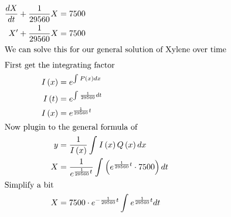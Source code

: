 \documentclass[12pt]{article}
\begin{document}
\begin{align}
  \frac{dX}{dt}+\frac{1}{29560}X                                                           & =7500                                                                                                                                                                     \\
  X'+\frac{1}{29560}X                                                                      & =7500                                                                                                                                                                     \\
  \intertext{We can solve this for our general solution of Xylene over time}
  \intertext{First get the integrating factor}
  I\left(x\right)                                                                          & =e^{\int_{ }^{ }P\left(x\right)dx}                                                                                                                                        \\
  I\left(t\right)                                                                          & =e^{\int_{ }^{ }\frac{1}{29560}dt}                                                                                                                                        \\
  I\left(x\right)                                                                          & =e^{\frac{1}{29560}t}                                                                                                                                                     \\
  \intertext{Now plugin to the general formula of}
  y                                                                                        & =\frac{1}{I\left(x\right)}\int_{ }^{ }I\left(x\right)Q\left(x\right)dx                                                                                                    \\
  X                                                                                        & =\frac{1}{e^{\frac{1}{29560}t}}\int_{ }^{ }\left(e^{\frac{1}{29560}t}\cdot7500\right)dt                                                                                   \\
  \intertext{Simplify a bit}
  X                                                                                        & =7500\cdot e^{-\frac{1}{29560}t}\int_{ }^{ }e^{\frac{1}{29560}t}dt                                                                                                        \\

\end{align}
\end{document}
